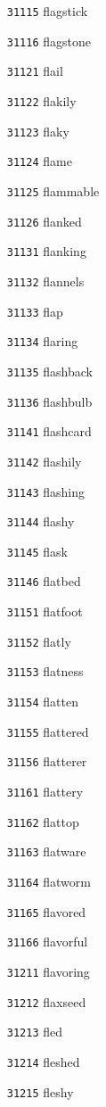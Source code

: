 \documentclass[twoside,11pt]{article}
\begin{document}
\begin{multicols}{5}
\begin{enumerate}
\item[\texttt{31115}] flagstick
\item[\texttt{31116}] flagstone
\item[\texttt{31121}] flail
\item[\texttt{31122}] flakily
\item[\texttt{31123}] flaky
\item[\texttt{31124}] flame
\item[\texttt{31125}] flammable
\item[\texttt{31126}] flanked
\item[\texttt{31131}] flanking
\item[\texttt{31132}] flannels
\item[\texttt{31133}] flap
\item[\texttt{31134}] flaring
\item[\texttt{31135}] flashback
\item[\texttt{31136}] flashbulb
\item[\texttt{31141}] flashcard
\item[\texttt{31142}] flashily
\item[\texttt{31143}] flashing
\item[\texttt{31144}] flashy
\item[\texttt{31145}] flask
\item[\texttt{31146}] flatbed
\item[\texttt{31151}] flatfoot
\item[\texttt{31152}] flatly
\item[\texttt{31153}] flatness
\item[\texttt{31154}] flatten
\item[\texttt{31155}] flattered
\item[\texttt{31156}] flatterer
\item[\texttt{31161}] flattery
\item[\texttt{31162}] flattop
\item[\texttt{31163}] flatware
\item[\texttt{31164}] flatworm
\item[\texttt{31165}] flavored
\item[\texttt{31166}] flavorful
\item[\texttt{31211}] flavoring
\item[\texttt{31212}] flaxseed
\item[\texttt{31213}] fled
\item[\texttt{31214}] fleshed
\item[\texttt{31215}] fleshy

\end{enumerate}
\end{multicols}
\end{document}
